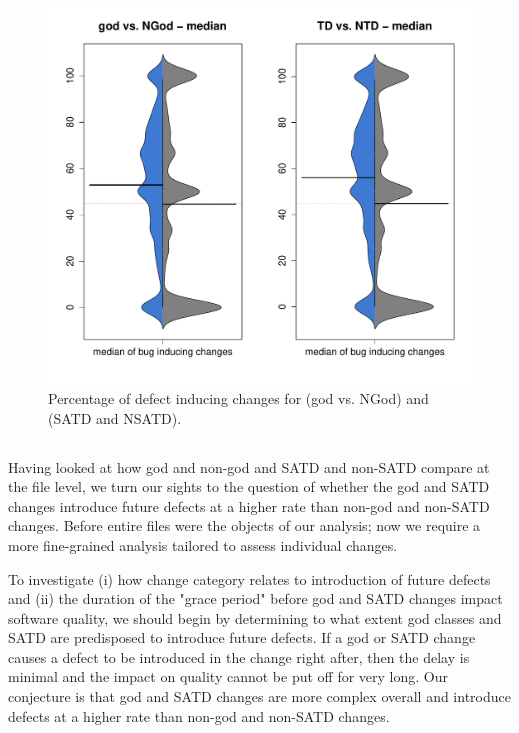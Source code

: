 \begin{figure}[tb!]
	\centering
	\includegraphics[width=140mm]{figures/chapter4/rq2_distrubtion_god_and_td}
	\caption{Percentage of defect inducing changes for (god vs. NGod) and (SATD and NSATD).}
	\label{figure:ch4_bug_inducing_changes}
\end{figure}

\subsection*{\chapterIVrqII}


Having looked at how god and non-god and SATD and non-SATD compare at the file level, we turn our sights to the question of whether the god and SATD changes introduce future defects at a higher rate than non-god and non-SATD changes. Before entire files were the objects of our analysis; now we require a more fine-grained analysis tailored to assess individual changes.


To investigate (i) how change category relates to introduction of future defects and (ii) the duration of the "grace period" before god and SATD changes impact software quality, we should begin by determining to what extent god classes and SATD are predisposed to introduce future defects. If a god or SATD change causes a defect to be introduced in the change right after, then the delay is minimal and the impact on quality cannot be put off for very long. Our conjecture is that god and SATD changes are more complex overall and introduce defects at a higher rate than non-god and non-SATD changes.


